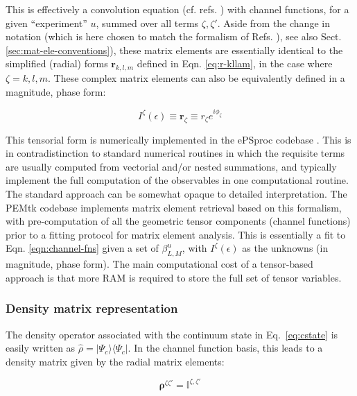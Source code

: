 \documentclass[10pt]{article}
\begin{document}
This is effectively a convolution equation (cf. refs. \cite{Reid2000,gregory2021MolecularFramePhotoelectron}) with channel functions, for a given ``experiment'' $u$, summed over all terms $\zeta,\zeta'$. Aside from the change in notation (which is here chosen to match the formalism of Refs. \cite{Gianturco1994, Lucchese1986, Natalense1999}), see also Sect. \ref{sec:mat-ele-conventions}), these matrix elements are essentially identical to the simplified (radial) forms $\mathbf{r}_{k,l,m}$ defined in Eqn. \ref{eq:r-kllam}, in the case where $\zeta=k,l,m$. These complex matrix elements can also be equivalently defined in a magnitude, phase form:

\begin{equation}
I^{\zeta}(\epsilon)\equiv\mathbf{r}_{\zeta}\equiv r_{\zeta}e^{i\phi_{\zeta}}
\end{equation}


This tensorial form is numerically implemented in the ePSproc codebase \cite{ePSprocGithub}. This is in contradistinction to standard numerical routines in which the requisite terms are usually computed from vectorial and/or nested summations, and typically implement the full computation of the observables in one computational routine. The standard approach can be somewhat opaque to detailed interpretation.  The PEMtk codebase \cite{hockett2021PEMtkGithub} implements matrix element retrieval based on this formalism, with pre-computation of all the geometric tensor components (channel functions) prior to a fitting protocol for matrix element analysis. This is essentially a fit to Eqn. \ref{eqn:channel-fns} given a set of $\beta_{L,M}^{u}$, with $I^{\zeta}(\epsilon)$ as the unknowns (in magnitude, phase form). The main computational cost of a tensor-based approach is that more RAM is required to store the full set of tensor variables.

\subsubsection{Density matrix representation\label{sec:density-mat-basic}}
The density operator associated with the continuum state in Eq.~\ref{eq:cstate} is easily written as $\hat{\rho}=|\Psi_c\rangle\langle\Psi_c|$. In the channel function basis, this leads to a density matrix given by the radial matrix elements:

\begin{equation}
\mathbf{\rho}^{\zeta\zeta'} = \mathbb{I}^{\zeta,\zeta'}
\label{eqn:radial-density-mat}
\end{equation}
\end{document}
